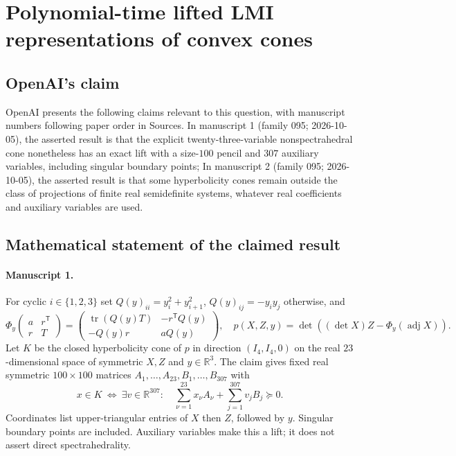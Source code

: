 \documentclass[11pt]{article}
\begin{document}
\section*{Polynomial-time lifted LMI representations of convex cones}

\subsection{OpenAI's claim}
OpenAI presents the following claims relevant to this question, with manuscript numbers following paper order in Sources. In manuscript 1 (family 095; 2026-10-05), the asserted result is that the explicit twenty-three-variable nonspectrahedral cone nonetheless has an exact lift with a size-$100$ pencil and $307$ auxiliary variables, including singular boundary points; In manuscript 2 (family 095; 2026-10-05), the asserted result is that some hyperbolicity cones remain outside the class of projections of finite real semidefinite systems, whatever real coefficients and auxiliary variables are used.

\subsection{Mathematical statement of the claimed result}
\paragraph{Manuscript 1.}
For cyclic $i\in\{1,2,3\}$ set $Q(y)_{ii}=y_i^2+y_{i+1}^2$, $Q(y)_{ij}=-y_i y_j$ otherwise, and
\[
 \Phi_y\begin{pmatrix}a&r^{\mathsf T}\\r&T\end{pmatrix}
 =\begin{pmatrix}\operatorname{tr}(Q(y)T)&-r^{\mathsf T}Q(y)\\-Q(y)r&aQ(y)\end{pmatrix},
 \quad p(X,Z,y)=\det((\det X)Z-\Phi_y(\operatorname{adj}X)).
\]
Let $K$ be the closed hyperbolicity cone of $p$ in direction $(I_4,I_4,0)$ on the real $23$-dimensional space of symmetric $X,Z$ and $y\in\mathbb R^3$. The claim gives fixed real symmetric $100\times100$ matrices $A_1,\ldots,A_{23},B_1,\ldots,B_{307}$ with
\[
 x\in K\ \Longleftrightarrow\ \exists v\in\mathbb R^{307}:\quad
 \sum_{\nu=1}^{23}x_{\nu} A_{\nu}+\sum_{j=1}^{307}v_jB_j\succeq0.
\]
Coordinates list upper-triangular entries of $X$ then $Z$, followed by $y$. Singular boundary points are included. Auxiliary variables make this a lift; it does not assert direct spectrahedrality.
\end{document}
